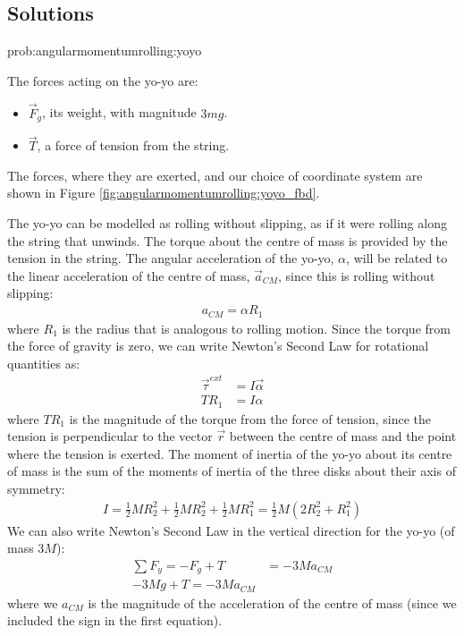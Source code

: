 \subsection{Solutions}
\begin{solution}{prob:angularmomentumrolling:yoyo}\label{soln:angularmomentumrolling:yoyo}

The forces acting on the yo-yo are:
\begin{itemize}
\item $\vec F_g$, its weight, with magnitude $3mg$.
\item $\vec T$, a force of tension from the string.
\end{itemize}
The forces, where they are exerted, and our choice of coordinate system are shown in Figure \ref{fig:angularmomentumrolling:yoyo_fbd}.

The yo-yo can be modelled as rolling without slipping, as if it were rolling along the string that unwinds. The torque about the centre of mass is provided by the tension in the string. The angular acceleration of the yo-yo, $\alpha$, will be related to the linear acceleration of the centre of mass, $\vec a_{CM}$, since this is rolling without slipping:
\begin{align*}
a_{CM}=\alpha R_1
\end{align*}
where $R_1$ is the radius that is analogous to rolling motion. Since the torque from the force of gravity is zero, we can write Newton's Second Law for rotational quantities as:
\begin{align*}
\vec\tau^{ext}&=I\vec\alpha\\
TR_1 &= I\alpha
\end{align*}
where $TR_1$ is the magnitude of the torque from the force of tension, since the tension is perpendicular to the vector $\vec r$ between the centre of mass and the point where the tension is exerted. The moment of inertia of the yo-yo about its centre of mass is the sum of the moments of inertia of the three disks about their axis of symmetry:
\begin{align*}
I=\frac{1}{2}MR_2^2 +\frac{1}{2} MR_2^2+\frac{1}{2}MR_1^2=\frac{1}{2}M(2R_2^2+R_1^2)
\end{align*}
We can also write Newton's Second Law in the vertical direction for the yo-yo (of mass $3M$):
\begin{align*}
\sum F_y = -F_g + T &= -3Ma_{CM}\\
-3Mg + T = -3Ma_{CM}
\end{align*}
where we $a_{CM}$ is the magnitude of the acceleration of the centre of mass (since we included the sign in the first equation).


\end{solution}
